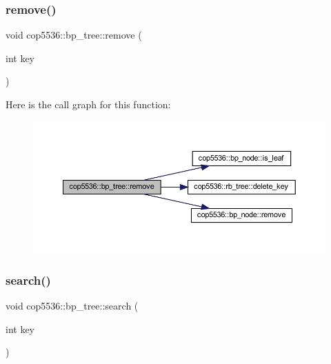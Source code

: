 \subsubsection{remove()}
{\footnotesize\ttfamily void cop5536\+::bp\+\_\+tree\+::remove (\begin{DoxyParamCaption}\item[{int}]{key }\end{DoxyParamCaption})}

Here is the call graph for this function\+:
\nopagebreak
\begin{figure}[H]
\begin{center}
\leavevmode
\includegraphics[width=350pt]{classcop5536_1_1bp__tree_a424febb6a1d7ce333d8713f43d9462a5_cgraph}
\end{center}
\end{figure}
\mbox{\label{classcop5536_1_1bp__tree_ab19cba7e122848174579357585b43cb4}} 
\subsubsection{search()\hspace{0.1cm}{\footnotesize\ttfamily [1/2]}}
{\footnotesize\ttfamily void cop5536\+::bp\+\_\+tree\+::search (\begin{DoxyParamCaption}\item[{int}]{key }\end{DoxyParamCaption})\hspace{0.3cm}{\ttfamily [inline]}}

